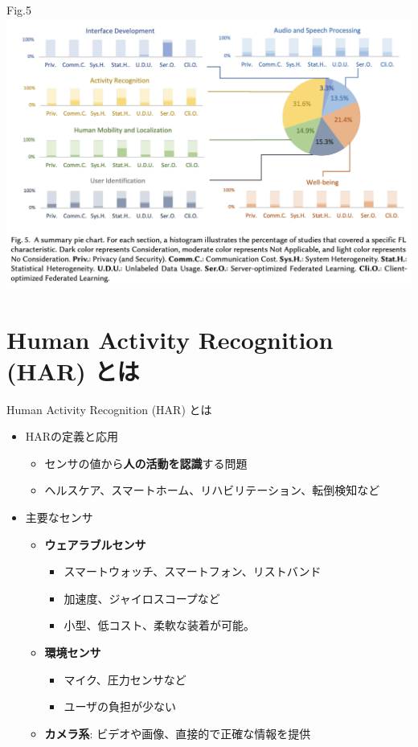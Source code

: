 \documentclass[unicode,12pt,aspectratio=169,dvipdfmx]{beamer}
\begin{document}
\begin{frame}{Fig.5}
    \center \includegraphics[scale=0.3]{figures/domain_per.png}                    
\end{frame}


\section{Human Activity Recognition (HAR) とは}
\begin{frame}{Human Activity Recognition (HAR) とは}
    \begin{itemize}
        \item HARの定義と応用
        \begin{itemize}
            \item センサの値から\textbf{人の活動を認識}する問題
            \item ヘルスケア、スマートホーム、リハビリテーション、転倒検知など
        \end{itemize}
        \item 主要なセンサ
        \begin{itemize}
            \item \textbf{ウェアラブルセンサ}
                \begin{itemize}
                    \item スマートウォッチ、スマートフォン、リストバンド
                    \item 加速度、ジャイロスコープなど
                    \item 小型、低コスト、柔軟な装着が可能。
                \end{itemize}
            \item \textbf{環境センサ}
                \begin{itemize}
                    \item マイク、圧力センサなど
                    \item ユーザの負担が少ない
                \end{itemize}
            \item \textbf{カメラ系}: ビデオや画像、直接的で正確な情報を提供
        \end{itemize}
    \end{itemize}
\end{frame}
\end{document}
